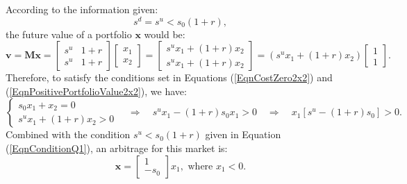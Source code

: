 \documentclass[final,3p,times]{elsarticle}
\begin{document}
	According to the information given:
	\begin{equation}
		\label{EqnConditionQ1}
		s^d = s^u < s_0 \left(1+r\right)
		,
	\end{equation}
	the future value of a portfolio $\mathbf{x}$ would be:
	\begin{equation}
		\mathbf{v}=\mathbf{Mx}=
			\begin{bmatrix} s^u & 1+r \\ s^u & 1+r \end{bmatrix}
			\begin{bmatrix} x_1 \\ x_2 \end{bmatrix}
			=
			\begin{bmatrix} s^u x_1 + \left(1+r\right) x_2 \\ s^u x_1 + \left(1+r\right) x_2 \end{bmatrix}
			=
			\left( s^u x_1 + \left(1+r\right) x_2 \right) \begin{bmatrix} 1 \\ 1 \end{bmatrix}
			.
	\end{equation}
	Therefore, to satisfy the conditions set in Equations (\ref{EqnCostZero2x2}) and (\ref{EqnPositivePortfolioValue2x2}), we have:
	\begin{equation}
		\begin{cases}
			s_0 x_1 + x_2 = 0 \\
			s^u x_1 + \left(1+r\right) x_2 > 0
		\end{cases}
		\quad \Rightarrow \quad
		s^u x_1 - \left(1+r\right) s_0 x_1 > 0
		\quad \Rightarrow \quad
		x_1 \left[ s^u - \left(1+r\right) s_0 \right] > 0
		.
	\end{equation}
	Combined with the condition $s^u < s_0 \left(1+r\right)$ given in Equation (\ref{EqnConditionQ1}), an arbitrage for this market is:
	\begin{equation}
		\mathbf{x}=
			\begin{bmatrix} 1 \\ -s_0 \end{bmatrix} x_1, \text{ where } x_1<0
		.
	\end{equation}
	
\end{document}
